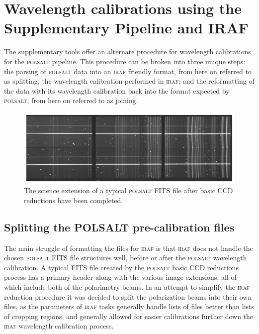 

\section{Wavelength calibrations using the Supplementary Pipeline and IRAF} \label{sec:mod_tools}

The supplementary tools offer an alternate procedure for wavelength calibrations for the \textsc{polsalt} pipeline. This procedure can be broken into three unique steps: the parsing of \textsc{polsalt} data into an \textsc{iraf} friendly format, from here on referred to as splitting; the wavelength calibration performed in \textsc{iraf}; and the reformatting of the data with its wavelength calibration back into the format expected by \textsc{polsalt}, from here on referred to as joining.

\begin{figure}[t]
    \centering
    \includegraphics[width = 1.0\textwidth]{figures/3_pre_wav_cal.pdf}
    \caption{The science extension of a typical \textsc{polsalt} \gls{FITS} file after basic \gls{CCD} reductions have been completed.}
    \label{fig:polsalt_pre_wav_cal}
\end{figure}


\subsection{Splitting the POLSALT pre-calibration files}

The main struggle of formatting the files for \textsc{iraf} is that \textsc{iraf} does not handle the chosen \textsc{polsalt} \gls{FITS} file structures well, before or after the \textsc{polsalt} wavelength calibration. A typical \gls{FITS} file created by the \textsc{polsalt} basic \gls{CCD} reductions process has a primary header along with the various image extensions, all of which include both of the polarimetry beams. In an attempt to simplify the \textsc{iraf} reduction procedure it was decided to split the polarization beams into their own files, as the parameters of \textsc{iraf} tasks generally handle lists of files better than lists of cropping regions, and generally allowed for easier calibrations further down the \textsc{iraf} wavelength calibration process.
\prgph

